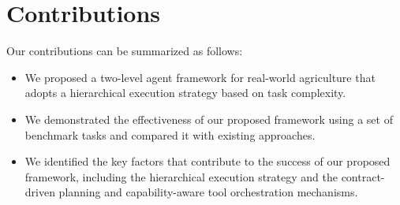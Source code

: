\documentclass{article}
\begin{document}
        \section{Contributions}
        Our contributions can be summarized as follows:
        \begin{itemize}
        \item We proposed a two-level agent framework for real-world agriculture that adopts a hierarchical execution strategy based on task complexity.
        \item We demonstrated the effectiveness of our proposed framework using a set of benchmark tasks and compared it with existing approaches.
        \item We identified the key factors that contribute to the success of our proposed framework, including the hierarchical execution strategy and the contract-driven planning and capability-aware tool orchestration mechanisms.
        \end{itemize}

        
\end{document}
